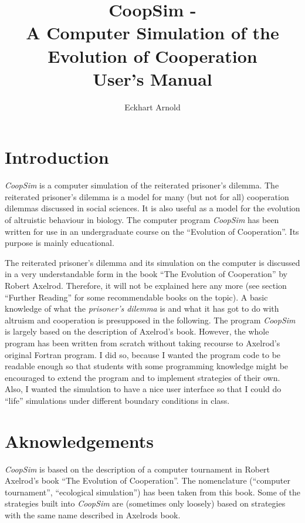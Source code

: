 \documentclass[12pt,a4paper,USenglish]{article}
\begin{document}
\title{CoopSim - \\A Computer Simulation of the Evolution of Cooperation\\User's Manual}
\author{Eckhart Arnold}

\maketitle

\tableofcontents{}


\section{Introduction}

\emph{CoopSim} is a computer simulation of the reiterated prisoner's
dilemma. The reiterated prisoner's dilemma is a model for many (but
not for all) cooperation dilemmas discussed in social sciences.
It is also useful as a model for the evolution of altruistic behaviour
in biology. The computer program \emph{CoopSim} has been written for
use in an undergraduate course on the ``Evolution of Cooperation''.
Its purpose is mainly educational.

The reiterated prisoner's dilemma and its simulation on the computer
is discussed in a very understandable form in the book ``The Evolution
of Cooperation'' by Robert Axelrod. Therefore, it will not be explained
here any more (see section ``Further Reading'' for some recommendable
books on the topic). A basic knowledge of what the \emph{prisoner's dilemma}
is and what it has got to do with altruism and cooperation is presupposed
in the following. The program \emph{CoopSim} is largely based on the
description of Axelrod's book. However, the whole program has been
written from scratch without taking recourse to Axelrod's original
Fortran program. I did so, because I wanted the program code to be
readable enough so that students with some programming knowledge might
be encouraged to extend the program and to implement strategies of
their own. Also, I wanted the simulation to have a nice user interface
so that I could do ``life'' simulations under different boundary
conditions in class.

\section{Aknowledgements}

\emph{CoopSim} is based on the description of a computer tournament
in Robert Axelrod's book ``The Evolution of Cooperation''. The
nomenclature (``computer tournament'', ``ecological simulation'') has
been taken from this book. Some of the strategies built into
\emph{CoopSim} are (sometimes only loosely) based on strategies with
the same name described in Axelrods book.
\end{document}
